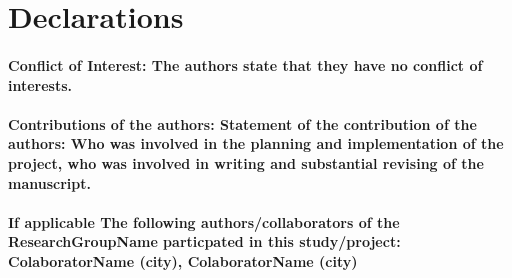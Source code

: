 \documentclass[aac]{iosart2x}
\begin{document}



\nocite{*} 
\section*{Declarations}
\paragraph{\noindent Conflict of Interest: The authors state that they have no conflict of interests.}


\paragraph{\noindent Contributions of the authors: Statement of the contribution of the authors: Who was involved in the planning and implementation of the project, who was involved in writing and substantial revising of the manuscript.}

\paragraph{\noindent If applicable The following {authors/collaborators} of the ResearchGroupName particpated in this {study/project}: ColaboratorName (city), ColaboratorName (city) }



%
\end{document}
